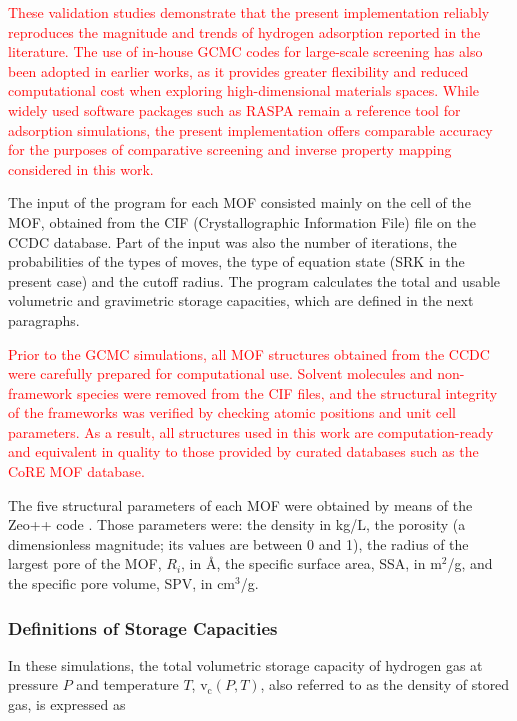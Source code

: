 \documentclass[review]{elsarticle}
\newcommand{\vc}{\mathrm{v_c}}
\begin{document}
\textcolor{red}{
These validation studies demonstrate that the present implementation reliably reproduces
the magnitude and trends of hydrogen adsorption reported in the literature.
The use of in-house GCMC codes for large-scale screening has also been adopted in earlier
works, as it provides greater flexibility and reduced computational cost when exploring
high-dimensional materials spaces.
While widely used software packages such as RASPA \cite{dces16} remain a reference tool for
adsorption simulations, the present implementation offers comparable accuracy for the
purposes of comparative screening and inverse property mapping considered in this work.
}

The input of the program for each MOF consisted mainly on the cell of the MOF, obtained from the CIF (Crystallographic Information File) file on the CCDC database. Part of the input was also the number of iterations, the probabilities of the types of moves, the type of equation state (SRK in the present case) and the cutoff radius. The program calculates the total and usable volumetric and gravimetric storage capacities, which are defined in the next paragraphs.

\textcolor{red}{Prior to the GCMC simulations, all MOF structures obtained from the CCDC were carefully prepared for computational use. Solvent molecules and non-framework species were removed from the CIF files, and the structural integrity of the frameworks was verified by checking atomic positions and unit cell parameters. As a result, all structures used in this work are computation-ready and equivalent in quality to those provided by curated databases such as the CoRE MOF database.
}

The five structural parameters of each MOF were obtained by means of the 
Zeo++ code \cite{zeoplusplus}. Those parameters were: the density in kg/L, 
the porosity (a dimensionless magnitude; its values are between 0 and 1), 
the radius of the largest pore of the MOF, $R_i$, in \AA{}, the specific 
surface area, SSA, in m$^2$/g, and the specific pore volume, SPV, in cm$^3$/g.

\subsubsection{Definitions of Storage Capacities}

In these simulations, the total volumetric storage capacity of hydrogen gas at pressure $P$ and temperature $T$, $\vc(P,T)$, also referred to as the density of stored gas, is expressed as
\end{document}
